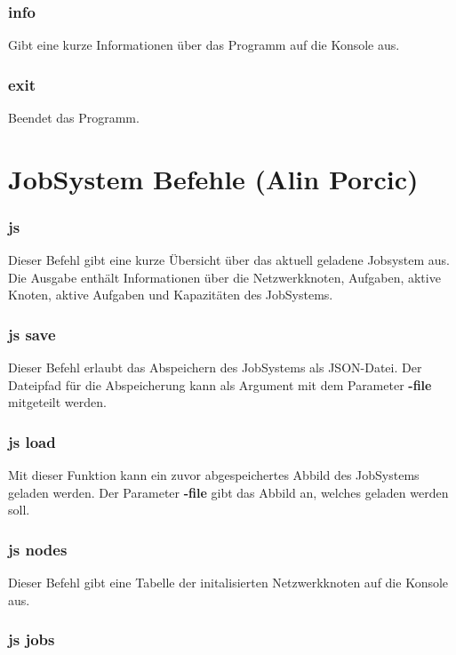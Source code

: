 \documentclass[12pt,a4paper]{report}
\begin{document}
\begin{onehalfspace}
\subsubsection{info}

Gibt eine kurze Informationen über das Programm auf die Konsole aus.

\subsubsection{exit}

Beendet das Programm.

\section{JobSystem Befehle (Alin Porcic)}

\subsubsection{js}

Dieser Befehl gibt eine kurze Übersicht über das aktuell geladene Jobsystem aus. Die Ausgabe enthält Informationen über die Netzwerkknoten, Aufgaben, aktive Knoten, aktive Aufgaben und Kapazitäten des JobSystems.

\subsubsection{js save}

Dieser Befehl erlaubt das Abspeichern des JobSystems als JSON-Datei. Der Dateipfad für die Abspeicherung kann als Argument mit dem Parameter \textbf{-file} mitgeteilt werden.

\subsubsection{js load}

Mit dieser Funktion kann ein zuvor abgespeichertes Abbild des JobSystems geladen werden. Der Parameter \textbf{-file} gibt das Abbild an, welches geladen werden soll.

\subsubsection{js nodes}

Dieser Befehl gibt eine Tabelle der initalisierten Netzwerkknoten auf die Konsole aus.

\subsubsection{js jobs}


\end{onehalfspace}
\end{document}
